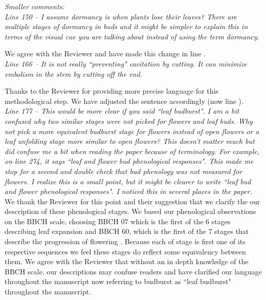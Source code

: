 \documentclass[11pt]{article}
\begin{document}
\emph{Smaller comments:}\\

\emph{Line 150 – I assume dormancy is when plants lose their leaves? There are multiple stages of dormancy in buds and it might be simpler to explain this in terms of the visual cue you are talking about instead of using the term dormancy.}

\noindent We agree with the Reviewer and have made this change in line .\\

\emph{Line 166 – It is not really ``preventing" cavitation by cutting. It can minimize embolism in the stem by cutting off the end.}

\noindent Thanks to the Reviewer for providing more precise language for this methodological step. We have adjusted the sentence accordingly (now line ).\\


\emph{Line  177 – This would be more clear if you said ``leaf budburst". I am a bit confused why two similar stages were not picked for flowers and leaf buds. Why not pick a more equivalent budburst stage for flowers instead of open flowers or a leaf unfolding stage more similar to open flowers? This doesn’t matter much but did confuse me a bit when reading the paper because of terminology. For example, on line 274, it says ``leaf and flower bud phenological responses". This made me stop for a second and double check that bud phenology was not measured for flowers. I realize this is a small point, but it might be clearer to write ``leaf bud and flower phenological responses". I noticed this in several places in the paper.}\\

\noindent We thank the Reviewer for this point and their suggestion that we clarify the our description of these phenological stages. We based our phenological observations on the BBCH scale, choosing BBCH 07 which is the first of the 6 stages describing leaf expansion and BBCH 60, which is the first of the 7 stages that describe the progression of flowering \citep{Finn2007}. Because each of stage is first one of its respective sequences we feel these stages do reflect some equivalency between them. %
We agree with the Reviewer that without an in depth knowledge of the BBCH scale, our descriptions may confuse readers and have clarified our language throughout the manuscript now referring to budburst as ``leaf budburst" throughout the manuscript.\\
\end{document}
